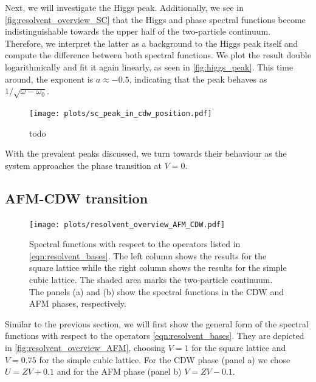 \documentclass[
    reprint, 
    aps,
    preprintnumbers,
    twocolumn,
    prb,
    superscriptaddress
]{revtex4-2}
\begin{document}
Next, we will investigate the Higgs peak. 
Additionally, we see in \autoref{fig:resolvent_overview_SC} that the Higgs and phase spectral functions become indistinguishable towards the upper half of the two-particle continuum.
Therefore, we interpret the latter as a background to the Higgs peak itself and compute the difference between both spectral functions.
We plot the result double logarithmically and fit it again linearly, as seen in \autoref{fig:higgs_peak}.
This time around, the exponent is $a\approx-0.5$, indicating that the peak behaves as $1 / \sqrt{\omega - \omega_0}$.

\begin{figure}
    \centering
    \texttt{[image: plots/sc\_peak\_in\_cdw\_position.pdf]}
    \caption{todo}
    \label{fig:sc_in_cdw_behaviour}
\end{figure}

With the prevalent peaks discussed, we turn towards their behaviour as the system approaches the phase transition at $V=0$.

\subsection{AFM-CDW transition}

\begin{figure}
    \centering
    \texttt{[image: plots/resolvent\_overview\_AFM\_CDW.pdf]}
    \caption{Spectral functions with respect to the operators listed in \eqref{eqn:resolvent_bases}.
    The left column shows the results for the square lattice while the right column shows the results for the simple cubic lattice.
    The shaded area marks the two-particle continuum.
    The panels (a) and (b) show the spectral functions in the CDW and AFM phases, respectively.}
    \label{fig:resolvent_overview_AFM}
\end{figure}

Similar to the previous section, we will first show the general form of the spectral functions with respect to the operators \eqref{eqn:resolvent_bases}.
They are depicted in \autoref{fig:resolvent_overview_AFM}, choosing $V=1$ for the square lattice and $V=0.75$ for the simple cubic lattice.
For the CDW phase (panel a) we chose $U=ZV + 0.1$ and for the AFM phase (panel b) $V=ZV - 0.1$.


\end{document}
